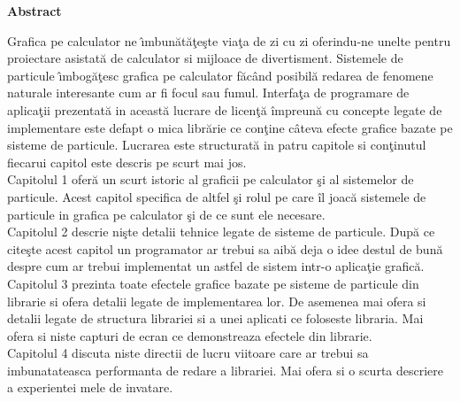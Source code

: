 \thispagestyle{plain}

\begin{center}
	\textbf{Abstract}
\end{center}

Grafica pe calculator ne \^ \i mbun\u{a}t\u{a}\c{t}e\c{s}te via\c{t}a de zi cu zi oferindu-ne unelte pentru proiectare asistată de calculator si mijloace de divertisment. Sistemele de particule \^ \i mbog\u{a}\c{t}esc grafica pe calculator f\u{a}c\^{a}nd posibil\u{a} redarea de fenomene naturale interesante cum ar fi focul sau fumul. Interfa\c{t}a de programare de aplica\c{t}ii prezentat\u{a} in aceast\u{a} lucrare de licen\c{t}\u{a} \^{i}mpreun\u{a} cu concepte legate de implementare este defapt o mica libr\u{a}rie ce con\c{t}ine c\^{a}teva efecte grafice bazate pe sisteme de particule. Lucrarea este structurat\u{a} in patru capitole si con\c{t}inutul fiecarui capitol este descris pe scurt mai jos.\\

Capitolul 1 ofer\u{a} un scurt istoric al graficii pe calculator \c{s}i al sistemelor de particule. Acest capitol specifica de altfel \c{s}i rolul pe care \^{i}l joac\u{a} sistemele de particule in grafica pe calculator \c{s}i de ce sunt ele necesare.\\

Capitolul 2 descrie ni\c{s}te detalii tehnice legate de sisteme de particule. Dup\u{a} ce cite\c{s}te acest capitol un programator ar trebui sa aib\u{a} deja o idee destul de bun\u{a} despre cum ar trebui implementat un astfel de sistem intr-o aplica\c{t}ie grafic\u{a}.\\

Capitolul 3 prezinta toate efectele grafice bazate pe sisteme de particule din librarie si ofera detalii legate de implementarea lor.
De asemenea mai ofera si detalii legate de structura librariei si a unei aplicati ce foloseste libraria. Mai ofera si niste capturi de ecran ce demonstreaza efectele din librarie.\\

Capitolul 4 discuta niste directii de lucru viitoare care ar trebui sa imbunatateasca performanta de redare a librariei. Mai ofera si o scurta descriere a experientei mele de invatare.